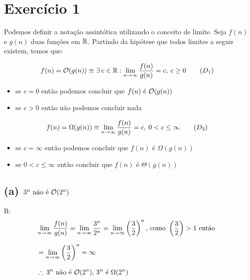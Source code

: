 \section*{Exercício 1}
  Podemos definir a notação assintótica utilizando o conceito de limite. Seja $f(n)$ e $g(n)$ duas funções em $\mathbb{R}$. Partindo da hipótese que todos limites a seguir existem, temos que:

  \begin{equation}
    \setlength{\jot}{10pt}
    \begin{aligned}
      f(n) = \bigO(g(n)) \equiv \exists\:c \in \setR: \lim_{n \to\infty} \frac{f(n)}{g(n)} = c,\: c \geq0
    \end{aligned}\tag{$D_1$}
  \end{equation}
  \begin{itemize}
    \item{se $c = 0$ então podemos concluir que $f(n) \text{ é } \mathcal{O}(g(n))$}
    \item{se $c > 0$ então não podemos concluir nada}
  \end{itemize}

  \begin{equation}
    \setlength{\jot}{10pt}
    \begin{aligned}
      f(n) = \Omega(g(n)) \equiv \lim_{n \to\infty} \frac{f(n)}{g(n)} = c,\: 0 < c \leq \infty
    \end{aligned}\tag{$D_2$}
  \end{equation}
  \begin{itemize}
    \item{se $c = \infty$ então podemos concluir que $f(n) \text{ é } \Omega(g(n))$}
    \item{se $0 < c \leq \infty$ então concluir que  $f(n) \text{ é } \Theta(g(n))$}
  \end{itemize}
  \newpage
  \subsection*{(a) $3^n \text{ não é } \mathcal{O}(2^n)$}
  R:
  \begin{equation}
    \setlength{\jot}{10pt}
    \begin{aligned}
    &\lim_{n \to\infty} \frac{f(n)}{g(n)} = \lim_{n \to\infty} \frac{3^n}{2^n} = \lim_{n \to\infty} \left(\frac{3}{2}\right)^n \text{, como } \left(\frac{3}{2}\right) > 1 \text{ então } \\
    &= \lim_{n \to\infty} \left(\frac{3}{2}\right)^n = \infty \\
    &\therefore\: 3^n \text{ não é } \bigO(2^n) \text{, } 3^n \text{ é } \Omega(2^n)
  \end{aligned}\end{equation}

